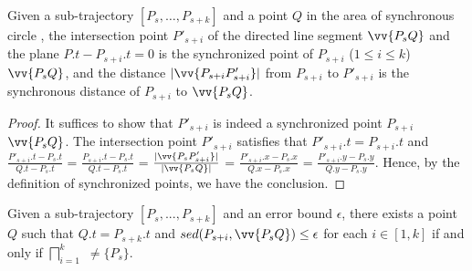 




\begin{prop}
\label{prop-3d-syn-point}
Given a sub-trajectory $[P_s, \ldots, P_{s+k}]$ and a point $Q$ in the area of synchronous circle , the intersection point $P'_{s+i}$ of the directed line segment $\vv{P_sQ}$ and the plane $P.t - P_{s+i}.t = 0$ is the synchronized point of $P_{s+i}$ ($1\le i\le k$) \wrt  $\vv{P_sQ}$, and the distance $|\vv{P_{s+i}P'_{s+i}}|$ from $P_{s+i}$ to $P'_{s+i}$ is the synchronous distance of $P_{s+i}$ to $\vv{P_sQ}$.
\end{prop}

\begin{proof} It suffices to show that $P'_{s+i}$ is indeed a synchronized point $P_{s+i}$ \wrt $\vv{P_sQ}$.
%
The intersection point $P'_{s+i}$ satisfies that $P'_{s+i}.t = P_{s+i}.t$ and
$\frac{P'_{s+i}.t - P_{s}.t}{Q.t - P_{s}.t}$ = $\frac{P_{s+i}.t - P_{s}.t}{Q.t - P_{s}.t}$  =
$\frac{|\vv{P_sP'_{s+i}}|}{|\vv{P_sQ}|}$ =
$\frac{P'_{s+i}.x - P_{s}.x}{Q.x - P_{s}.x}$ = $\frac{P'_{s+i}.y - P_{s}.y}{Q.y - P_{s}.y}$.
%
Hence, by the definition of synchronized points, we have the conclusion.
\end{proof}






\begin{prop}
\label{prop-3d-ci}
Given a sub-trajectory $[P_s,...,P_{s+k}]$ and an error bound $\epsilon$, there exists a point $Q$ such that $Q.t = P_{s+k}.t$ and $sed(P_{s+i}, \vv{P_sQ})\le \epsilon$ for each $i \in [1,k]$ if and only if $\bigsqcap_{i=1}^{k}$ $\ne \{P_s\}$.
\end{prop}

